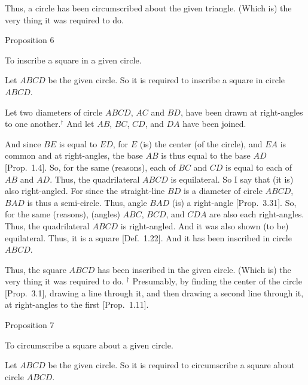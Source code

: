 Thus, a circle has been circumscribed about the given triangle. (Which is)
the very thing it was required to do.


\begin{center}
{\large Proposition 6}
\end{center}

To inscribe a square in a given circle.

\epsfysize=2.2in
\centerline{}

Let $ABCD$ be the given circle. So it is required to inscribe a square in circle
$ABCD$.

Let two diameters  of circle $ABCD$,  $AC$ and $BD$, have been drawn at right-angles to one another.$^\dag$ And let $AB$, $BC$, $CD$, and $DA$ have been joined.

And since $BE$ is equal to $ED$, for $E$ (is) the center (of the circle), and $EA$
is common and at right-angles, the base $AB$ is thus equal to the base $AD$ [Prop.~1.4]. So, for the same (reasons), each of $BC$ and $CD$ is equal
to each of $AB$ and $AD$. Thus, the quadrilateral $ABCD$ is equilateral. So I say
that (it is) also right-angled. For since the straight-line $BD$ is a diameter
of circle $ABCD$, $BAD$ is thus a semi-circle. Thus, angle $BAD$ (is) a right-angle
[Prop.~3.31]. So, for the same (reasons), (angles)
$ABC$, $BCD$, and $CDA$ are also each right-angles. Thus, the quadrilateral $ABCD$
is right-angled. And it was also shown (to be) equilateral. Thus, it is a square [Def.~1.22]. And it has been inscribed in circle
$ABCD$.

Thus, the square $ABCD$ has been inscribed in the given circle. (Which is)
the very thing it was required to do.
{\footnotesize \noindent$^\dag$ Presumably, by finding the center of the circle [Prop.~3.1], 
drawing a line through it, and then drawing a second line through it, at right-angles to the first [Prop.~1.11].} 


\begin{center}
{\large Proposition 7}
\end{center}

To circumscribe a square about a given circle.

Let $ABCD$ be the given circle. So it is required to circumscribe a square
about circle $ABCD$.

